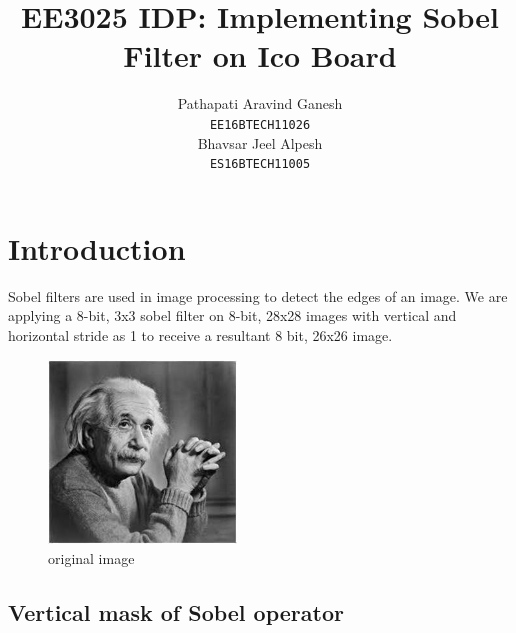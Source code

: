 \documentclass[11pt]{article}
\title{EE3025 IDP: Implementing Sobel Filter on Ico Board}
\author{Pathapati Aravind Ganesh \\
  {\tt EE16BTECH11026} \\\And
  Bhavsar Jeel Alpesh\\
  {\tt ES16BTECH11005} \\}
\begin{document}
\maketitle
  



\section{Introduction}

Sobel filters are used in image processing to detect the edges of an image. We are applying a 8-bit, 3x3 sobel filter on 8-bit, 28x28 images with vertical and horizontal stride as 1 to receive a resultant 8 bit, 26x26 image.

\begin{figure}[htp]
\centering
\includegraphics[width=5cm]{sobel1.jpg}
\caption{original image}
\label{fig:Einstein}
\end{figure}


\subsection{Vertical mask of Sobel operator}
\end{document}
